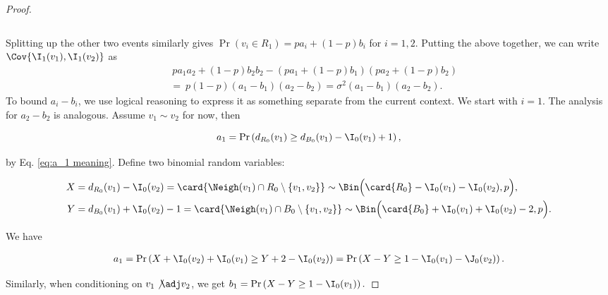 \documentclass[11pt]{article}
\numberwithin{equation}{section}
\theoremstyle{definition}
\theoremstyle{plain}
\begin{document}
\begin{proof}
\begin{linenomath}
\begin{equation*}
				\end{equation*}\end{linenomath}
				Splitting up the other two events similarly gives
				$\Pr\left(v_i \in R_1\right) =  pa_i + (1 - p)b_i$
				for $i = 1, 2$.
				Putting the above together, we can write $\Cov{\I_1(v_1), \I_1(v_2)}$ as
				\begin{equation} \label{eq:temp34}
					\begin{aligned}
						\ & \ pa_1a_2 + (1 - p)b_2b_2 - \left(pa_1 + (1 - p)b_1\right) \left(pa_2 + (1 - p)b_2 \right) \\
						\ & = \ p(1 - p)(a_1 - b_1)(a_2 - b_2) = \sigma^2(a_1 - b_1)(a_2 - b_2).
					\end{aligned}
				\end{equation}
				To bound $a_i - b_i$, we use logical reasoning to express it as something separate from the current context.
				We start with $i = 1$. The analysis for $a_2 - b_2$ is analogous.
				Assume  %
				$v_1 \sim v_2$ for now, then
				\begin{linenomath}\begin{equation*}
						a_1 = \Pr\left(d_{R_0}(v_1) \ge d_{B_0}(v_1) - \I_0(v_1) + 1\right),
				\end{equation*}\end{linenomath}
				by Eq. \eqref{eq:a_1 meaning}.
				Define two binomial random variables:
				\begin{linenomath}\begin{equation*}
						\begin{aligned}
							X & = d_{R_0}(v_1) - \I_0(v_2) = \card{\Neigh(v_1)\cap  R_0\setminus \{v_1, v_2\}} 
							\sim \Bin\Bigl(\card{R_0} - \I_0(v_1) - \I_0(v_2), p\Bigr), \\
							Y & = d_{B_0}(v_1) + \I_0(v_2) - 1 = \card{\Neigh(v_1)\cap B_0\setminus \{v_1, v_2\}}
							\sim \Bin\Bigl(\card{B_0} + \I_0(v_1) + \I_0(v_2) - 2, p\Bigr).
						\end{aligned}
				\end{equation*}\end{linenomath}
				We have
				\begin{linenomath}\begin{equation*}
						\begin{aligned}
							a_1 = \Pr\left(X + \I_0(v_2) + \I_0(v_1) \ge Y + 2 - \I_0(v_2)\right)
							= \Pr\left(X - Y \ge 1 - \I_0(v_1) - \J_0(v_2)\right).
						\end{aligned}
				\end{equation*}\end{linenomath}
				Similarly, when conditioning on $v_1\not\adj v_2$, we get
				$
				b_1 = \Pr\left(X - Y \ge 1 - \I_0(v_1)\right).
				$
				

\end{proof}
\end{document}
